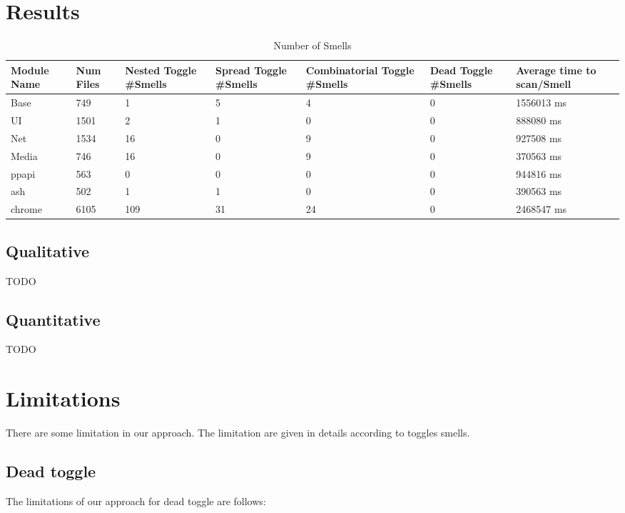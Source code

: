 \documentclass[conference]{IEEEtran}
\begin{document}
\section{Results}
\label{threats}
\begin{table}[ht]
\caption{Number of Smells}
\centering
\begin{tabular}{|p{2.1cm}|p{2.1cm}|p{2.1cm}|p{2.1cm}|p{2.1cm}|p{2.1cm}|p{2.1cm}|}
 \hline\hline
Module Name & Num Files & Nested Toggle \#Smells & Spread Toggle \#Smells & Combinatorial Toggle \#Smells &  Dead Toggle \#Smells & Average time to scan/Smell \\ \hline

Base & 749 & 1 & 5 & 4  & 0 & 1556013 ms \\ \hline
UI & 1501 & 2 & 1 & 0  & 0 & 888080 ms \\ \hline
Net & 1534 & 16 & 0 & 9  & 0 & 927508 ms \\ \hline
Media & 746 & 16 & 0 & 9  & 0 & 370563 ms \\ \hline
ppapi & 563 & 0 & 0 & 0  & 0 & 944816 ms \\ \hline
ash & 502 & 1 & 1 & 0  & 0 & 390563 ms \\ \hline
chrome & 6105 & 109 & 31 & 24  & 0 & 2468547 ms \\ \hline

\end{tabular}
\label{table:chrome-result-data}
\end{table}

\subsection{Qualitative}
TODO
\subsection{Quantitative}
TODO

\section{Limitations}
\label{Limitation of our approach}
There are some limitation in our approach. The limitation are given in details according to toggles smells.
\subsection{Dead toggle}
The limitations of our approach for dead toggle are follows:
\end{document}
